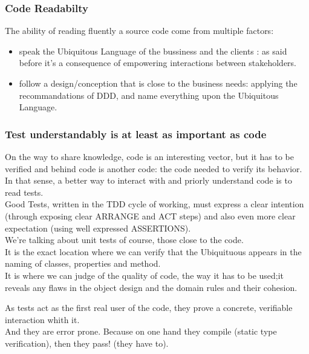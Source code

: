 \subsubsection{Code Readabilty}\label{code-readabilty}

The ability of reading fluently a source code come from multiple
factors:

\begin{itemize}
\itemsep1pt\parskip0pt
\item
  speak the Ubiquitous Language of the bussiness and the clients : as
  said before it's a consequence of empowering interactions between
  stakeholders.\\
\item
  follow a design/conception that is close to the business needs:
  applying the recommandations of DDD, and name everything upon the
  Ubiquitous Language.
\end{itemize}

\subsubsection{Test understandably is at least as important as
code}\label{test-understandably-is-at-least-as-important-as-code}

On the way to share knowledge, code is an interesting vector, but it has
to be verified and behind code is another code: the code needed to
verify its behavior.\\In that sense, a better way to interact with and
priorly understand code is to read tests.\\Good Tests, written in the
TDD cycle of working, must express a clear intention (through exposing
clear ARRANGE and ACT steps) and also even more clear expectation (using
well expressed ASSERTIONS).\\We're talking about unit tests of course,
those close to the code.\\It is the exact location where we can verify
that the Ubiquituous appears in the naming of classes, properties and
method.\\It is where we can judge of the quality of code, the way it has
to be used;it reveals any flaws in the object design and the domain
rules and their cohesion.

As tests act as the first real user of the code, they prove a concrete,
verifiable interaction whith it.\\And they are error prone. Because on
one hand they compile (static type verification), then they pass! (they
have to).

